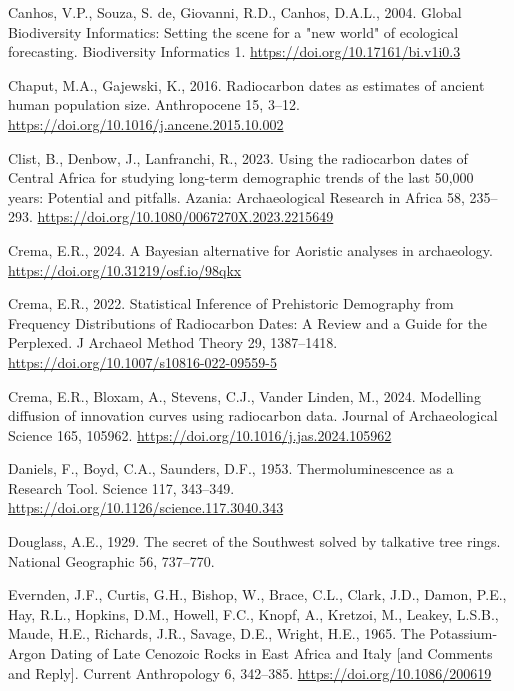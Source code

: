 \documentclass[
  number,
  doubleblind]{elsarticle}
\newlength{\cslhangindent}
\newenvironment{CSLReferences}[2] %
 {\begin{list}{}{%
  \setlength{\itemindent}{0pt}
  \setlength{\leftmargin}{0pt}
  \setlength{\parsep}{0pt}
  \ifodd #1
   \setlength{\leftmargin}{\cslhangindent}
   \setlength{\itemindent}{-1\cslhangindent}
  \fi
  \setlength{\itemsep}{#2\baselineskip}}}
 {\end{list}}
\begin{document}
\begin{CSLReferences}{1}{0}
Canhos, V.P., Souza, S. de, Giovanni, R.D., Canhos, D.A.L., 2004. Global
{Biodiversity Informatics}: Setting the scene for a "new world" of
ecological forecasting. Biodiversity Informatics 1.
\url{https://doi.org/10.17161/bi.v1i0.3}

Chaput, M.A., Gajewski, K., 2016. Radiocarbon dates as estimates of
ancient human population size. Anthropocene 15, 3--12.
\url{https://doi.org/10.1016/j.ancene.2015.10.002}

Clist, B., Denbow, J., Lanfranchi, R., 2023. Using the radiocarbon dates
of {Central Africa} for studying long-term demographic trends of the
last 50,000 years: Potential and pitfalls. Azania: Archaeological
Research in Africa 58, 235--293.
\url{https://doi.org/10.1080/0067270X.2023.2215649}

Crema, E.R., 2024. A {Bayesian} alternative for {Aoristic} analyses in
archaeology. \url{https://doi.org/10.31219/osf.io/98qkx}

Crema, E.R., 2022. Statistical {Inference} of {Prehistoric Demography}
from {Frequency Distributions} of {Radiocarbon Dates}: {A Review} and a
{Guide} for the {Perplexed}. J Archaeol Method Theory 29, 1387--1418.
\url{https://doi.org/10.1007/s10816-022-09559-5}

Crema, E.R., Bloxam, A., Stevens, C.J., Vander Linden, M., 2024.
Modelling diffusion of innovation curves using radiocarbon data. Journal
of Archaeological Science 165, 105962.
\url{https://doi.org/10.1016/j.jas.2024.105962}

Daniels, F., Boyd, C.A., Saunders, D.F., 1953. Thermoluminescence as a
{Research Tool}. Science 117, 343--349.
\url{https://doi.org/10.1126/science.117.3040.343}

Douglass, A.E., 1929. The secret of the {Southwest} solved by talkative
tree rings. National Geographic 56, 737--770.

Evernden, J.F., Curtis, G.H., Bishop, W., Brace, C.L., Clark, J.D.,
Damon, P.E., Hay, R.L., Hopkins, D.M., Howell, F.C., Knopf, A., Kretzoi,
M., Leakey, L.S.B., Maude, H.E., Richards, J.R., Savage, D.E., Wright,
H.E., 1965. The {Potassium-Argon Dating} of {Late Cenozoic Rocks} in
{East Africa} and {Italy} {[}and {Comments} and {Reply}{]}. Current
Anthropology 6, 342--385. \url{https://doi.org/10.1086/200619}


\end{CSLReferences}
\end{document}
